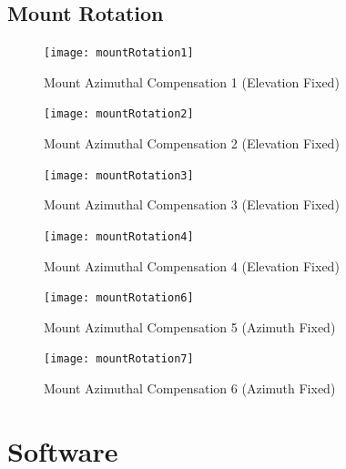 \section{Mount Rotation}\label{sec:appendix_mount_rotation}
\begin{figure}[!htb]
  \begin{minipage}{.32\textwidth}
    \centering
    \texttt{[image: mountRotation1]}
    \caption{Mount Azimuthal Compensation 1 (Elevation Fixed)}
    \label{fig:mountCompensation1}
  \end{minipage}
  \begin{minipage}{.32\textwidth}
    \centering
    \texttt{[image: mountRotation2]}
    \caption{Mount Azimuthal Compensation 2 (Elevation Fixed)}
    \label{fig:mountCompensation2}
  \end{minipage}
  \begin{minipage}{.32\textwidth}
    \centering
    \texttt{[image: mountRotation3]}
    \caption{Mount Azimuthal Compensation 3 (Elevation Fixed)}
    \label{fig:mountCompensation3}
  \end{minipage}
\end{figure}
\begin{figure}[!htb]
  \begin{minipage}{.32\textwidth}
    \centering
    \texttt{[image: mountRotation4]}
    \caption{Mount Azimuthal Compensation 4 (Elevation Fixed)}
    \label{fig:mountCompensation4}
  \end{minipage}
  \begin{minipage}{.32\textwidth}
    \centering
    \texttt{[image: mountRotation6]}
    \caption{Mount Azimuthal Compensation 5 (Azimuth Fixed)}
    \label{fig:mountCompensation5}
  \end{minipage}
  \begin{minipage}{.32\textwidth}
    \centering
    \texttt{[image: mountRotation7]}
    \caption{Mount Azimuthal Compensation 6 (Azimuth Fixed)}
    \label{fig:mountCompensation6}
  \end{minipage}
\end{figure}

\chapter{Software}

